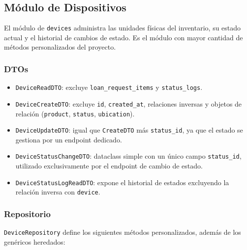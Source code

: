 \subsection{Módulo de Dispositivos}\label{sec:backend_dispositivos}

El módulo de \texttt{devices} administra las unidades físicas del inventario, su estado actual y el historial de cambios de estado. Es el módulo con mayor cantidad de métodos personalizados del proyecto.

\subsubsection*{DTOs}

\begin{itemize}
	\item \texttt{DeviceReadDTO}: excluye \texttt{loan\_request\_items} y \texttt{status\_logs}.
	\item \texttt{DeviceCreateDTO}: excluye \texttt{id}, \texttt{created\_at}, relaciones inversas y objetos de relación (\texttt{product}, \texttt{status}, \texttt{ubication}).
	\item \texttt{DeviceUpdateDTO}: igual que \texttt{CreateDTO} más \texttt{status\_id}, ya que el estado se gestiona por un endpoint dedicado.
	\item \texttt{DeviceStatusChangeDTO}: dataclass simple con un único campo \texttt{status\_id}, utilizado exclusivamente por el endpoint de cambio de estado.
	\item \texttt{DeviceStatusLogReadDTO}: expone el historial de estados excluyendo la relación inversa con \texttt{device}.
\end{itemize}

\subsubsection*{Repositorio}

\texttt{DeviceRepository} define los siguientes métodos personalizados, además de los genéricos heredados:

